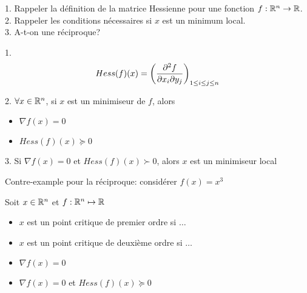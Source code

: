 



\begin{note}
  \begin{field}
    1. Rappeler la définition de la matrice Hessienne pour une fonction
    $f:\mathbb{R}^n \rightarrow \mathbb{R}$.\\
    2. Rappeler les conditions nécessaires si $x$ est un minimum local.\\
    3. A-t-on une réciproque?
  \end{field}
  \begin{field}
    1. $$Hess(f)(x) = \left(\frac{\partial^2 f}{\partial x_i \partial y_j}\right)_{1
      \leq i \leq j \leq n}$$

    2. $\forall x \in \mathbb{R}^n$, si $x$ est un minimiseur de $f$, alors
    \begin{itemize}
    \item $\nabla f(x) = 0$
    \item $Hess(f)(x) \succcurlyeq 0$
    \end{itemize}

    3. Si $\nabla f(x)=0$ et $Hess(f)(x) \succ 0$, alors $x$ est un
    minimiseur local
  \end{field}
  \begin{field}
    Contre-example pour la réciproque: considérer $f(x) = x^3$
  \end{field}
\end{note}

\begin{note}
  \begin{field}
    Soit $x \in \mathbb{R}^n$ et $f : \mathbb{R}^n \mapsto \mathbb{R}$
    \begin{itemize}
    \item $x$ est un point critique de premier ordre si $\dots$
    \item $x$ est un point critique de deuxième ordre si $\dots$
    \end{itemize}
  \end{field}
  \begin{field}
    \begin{itemize}
    \item $\nabla f(x) = 0$
    \item $\nabla f(x) = 0$ et $Hess(f)(x) \succcurlyeq 0$
    \end{itemize}
  \end{field}
  \begin{field}

  \end{field}
\end{note}

